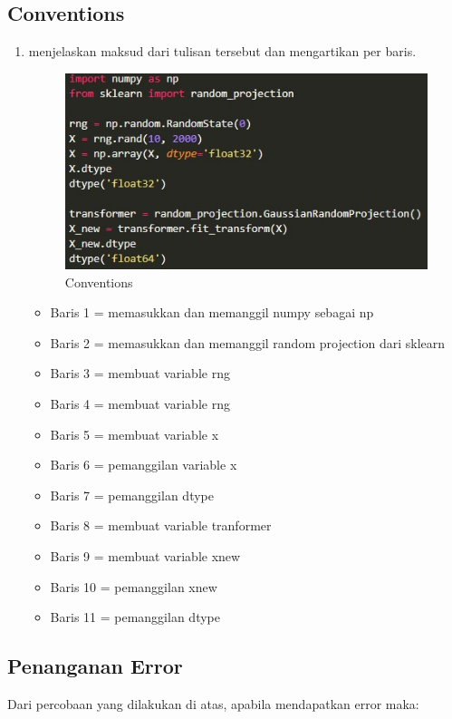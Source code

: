 \subsection{Conventions}
\begin{enumerate}
	\item menjelaskan maksud dari tulisan tersebut dan mengartikan per baris.
		\begin{figure}[ht]
		\centering
		\includegraphics[scale=0.5]{figures/d1.jpg}
		\caption{Conventions}
		\label{contoh}
		\end{figure}
		\begin{itemize}
			 \item   Baris 1 = memasukkan dan memanggil numpy sebagai np
             \item   Baris 2 = memasukkan dan memanggil random projection dari sklearn
             \item   Baris 3 = membuat variable rng
             \item   Baris 4 = membuat variable rng
             \item   Baris 5 = membuat variable x
             \item   Baris 6 = pemanggilan variable x
             \item   Baris 7 = pemanggilan dtype
             \item   Baris 8 = membuat variable tranformer
             \item   Baris 9 = membuat variable xnew
             \item   Baris 10 = pemanggilan xnew
             \item   Baris 11 = pemanggilan dtype

			\end{itemize}
\end{enumerate}

\subsection{Penanganan Error}
Dari percobaan yang dilakukan di atas, apabila mendapatkan error maka:

